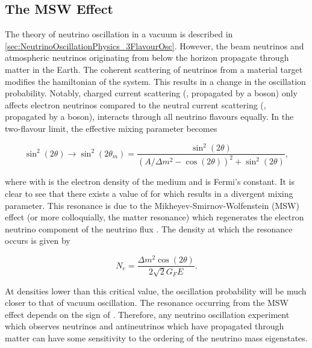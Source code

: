 \subsection{The MSW Effect}
\label{sec:NeutrinoOscillationPhysics_MSW}

The theory of neutrino oscillation in a vacuum is described in \autoref{sec:NeutrinoOscillationPhysics_3FlavourOsc}. However, the beam neutrinos and atmospheric neutrinos originating from below the horizon propagate through matter in the Earth. The coherent scattering of neutrinos from a material target modifies the hamiltonian of the system. This results in a change in the oscillation probability. Notably, charged current scattering (, propagated by a  boson) only affects electron neutrinos compared to the neutral current scattering (, propagated by a  boson), interacts through all neutrino flavours equally. In the two-flavour limit, the effective mixing parameter becomes

\begin{equation}
  \label{eq:NeutrinoOscillationPhysics_2Flavour_MSW}
  \sin^{2}(2\theta) \rightarrow \sin^{2}(2\theta_{m}) = \frac{\sin^{2}(2\theta)}{(A/\Delta m^{2} - \cos(2\theta))^{2} + \sin^{2}(2\theta)},
\end{equation}

where  with  is the electron density of the medium and  is Fermi's constant. It is clear to see that there exists a value of  for  which results in a divergent mixing parameter. This resonance is due to the Mikheyev-Smirnov-Wolfenstein (MSW) effect (or more colloquially, the matter resonance) which regenerates the electron neutrino component of the neutrino flux \cite{Smirnov2003-yb, msw, wolfenstein}. The density at which the resonance occurs is given by

\begin{equation}
  \label{eq:NeutrinoOscillationPhysics_ResonanceDensity}
  N_{e} = \frac{\Delta m^{2} \cos(2\theta)}{2\sqrt{2} G_{F} E}.
\end{equation}

At densities lower than this critical value, the oscillation probability will be much closer to that of vacuum oscillation. The resonance occurring from the MSW effect depends on the sign of . Therefore, any neutrino oscillation experiment which observes neutrinos and antineutrinos which have propagated through matter can have some sensitivity to the ordering of the neutrino mass eigenstates.

